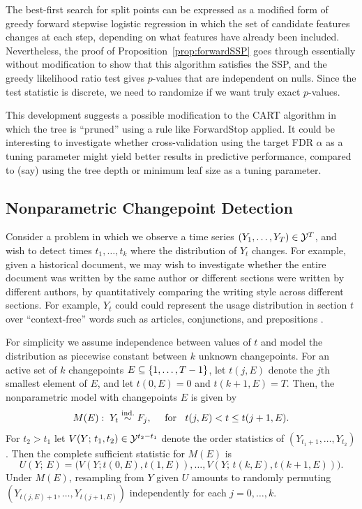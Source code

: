 \documentclass{article}
\begin{document}
The best-first search for split points can be expressed as a modified form of greedy forward stepwise logistic regression in which the set of candidate features changes at each step, depending on what features have already been included. Nevertheless, the proof of Proposition~\ref{prop:forwardSSP} goes through essentially without modification to show that this algorithm satisfies the SSP, and the greedy likelihood ratio test gives $p$-values that are independent on nulls. Since the test statistic is discrete, we need to randomize if we want truly exact $p$-values. 

This development suggests a possible modification to the CART algorithm in which the tree is ``pruned'' using a rule like ForwardStop applied. It could be interesting to investigate whether cross-validation using the target FDR $\alpha$ as a tuning parameter might yield better results in predictive performance, compared to (say) using the tree depth or minimum leaf size as a tuning parameter.

\subsection{Nonparametric Changepoint Detection}\label{sec:nonpar}

Consider a problem in which we observe a time series $(Y_1,\ldots,Y_T)\in \mathcal{Y}^T$, and wish to detect times $t_1,\ldots,t_k$ where the distribution of $Y_t$ changes. For example, given a historical document, we may wish to investigate whether the entire document was written by the same author or different sections were written by different authors, by quantitatively comparing the writing style across different sections. For example, $Y_t$ could could represent the usage distribution in section $t$ over ``context-free'' words such as articles, conjunctions, and prepositions \citep[see e.g.,][]{chen2015graph}.

For simplicity we assume independence between values of $t$ and model the distribution as piecewise constant between $k$ unknown changepoints. For an active set of $k$ changepoints $E\subseteq \{1,\ldots, T-1\}$, let $t(j,E)$ denote the $j$th smallest element of $E$, and let $t(0,E)=0$ and $t(k+1, E)=T$. Then, the nonparametric model with changepoints $E$ is given by
\begin{equation}\label{eq:nonpar-model}
  M(E):\; Y_t \overset{\textrm{ind.}}{\sim} F_j, \quad \text{ for } \;\;t(j,E) < t \leq t(j+1,E).
\end{equation}
For $t_2>t_1$ let $V(Y;\, t_1, t_2)\in \mathcal{Y}^{t_2-t_1}$ denote the order statistics of $(Y_{t_1+1},\ldots, Y_{t_2})$. Then the complete sufficient statistic for $M(E)$ is
\[
U(Y; \, E) = 
\bigg(
V(Y; t(0, E), t(1, E)), \ldots, V(Y;\, t(k, E), t(k+1,E))
\bigg).
\]
Under $M(E)$, resampling from $Y$ given $U$ amounts to randomly permuting $(Y_{t(j,E)+1}, \ldots, Y_{t(j+1,E)})$ independently for each $j=0,\ldots,k$.
\end{document}
